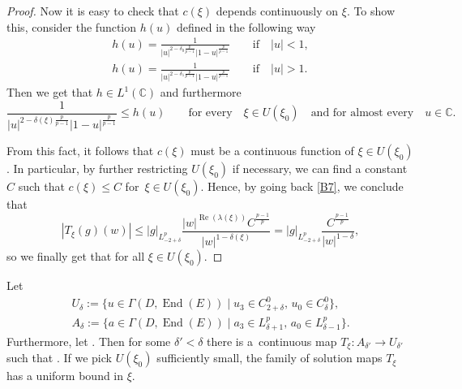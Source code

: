 \begin{proof}
Now it is easy to check that $c(\xi)$ depends continuously on $\xi$. To show this, consider the function $h(u)$ defined in the following way
\begin{gather*}
 h(u)=\frac{1}{|u|^{2-\delta_0\frac{p}{p-1}}|1-u|^{\frac{p}{p-1}}} \qquad \text{if} \quad |u|< 1,\\
 h(u)=\frac{1}{|u|^{2-\delta_1\frac{p}{p-1}}|1-u|^{\frac{p}{p-1}}} \qquad \text{if} \quad |u|> 1.
\end{gather*}
Then we get that $h \in L^1(\mathbb{C})$ and furthermore
\begin{equation*}
 \frac{1}{|u|^{2-\delta(\xi)\frac{p}{p-1}}|1-u|^{\frac{p}{p-1}}}\leq h(u) \qquad \text{for every}\quad \xi \in U(\xi_0)\quad \text{and for almost every} \quad u \in \mathbb{C}.
\end{equation*}

From this fact, it follows that $c(\xi)$ must be a continuous function of $\xi \in U(\xi_0)$. In particular, by further restricting $U(\xi_0)$ if necessary, we can find a constant $C$ such that $c(\xi)\leq C$ for~${\xi \in U(\xi_0)}$. Hence, by going back \eqref{B7}, we conclude that
\begin{equation*}
 |T_{\xi}(g)(w)|\leq |g|_{L^p_{-2+\delta}} \frac{|w|^{\operatorname{Re}(\lambda(\xi))}C^{\frac{p-1}{p}}}{|w|^{1-\delta(\xi)}}=|g|_{L^p_{-2+\delta}} \frac{C^{\frac{p-1}{p}}}{|w|^{1-\delta}},
\end{equation*}
so we finally get that
 for all $ \xi \in U(\xi_0)$.
\end{proof}

\begin{Lemma} Let
\begin{gather*}
U_{\delta}:=\bigl\{u \in \Gamma(D,\operatorname{End}(E)) \mid u_3 \in C^0_{2+\delta},\, u_0 \in C^0_{\delta}\bigr\},\\
A_{\delta}:= \bigl\{a \in \Gamma(D,\operatorname{End}(E)) \mid a_3 \in L^{p}_{\delta+1},\, a_0 \in L^{p}_{\delta-1}\bigr\}.
\end{gather*}
 Furthermore, let . Then for some $\delta'<\delta$ there is a~continuous map $T_{\xi}\colon A_{\delta'}\to U_{\delta'}$ such that . If we pick $U(\xi_0)$ sufficiently small, the family of solution maps $T_{\xi}$ has a uniform bound in $\xi$.
\end{Lemma}

